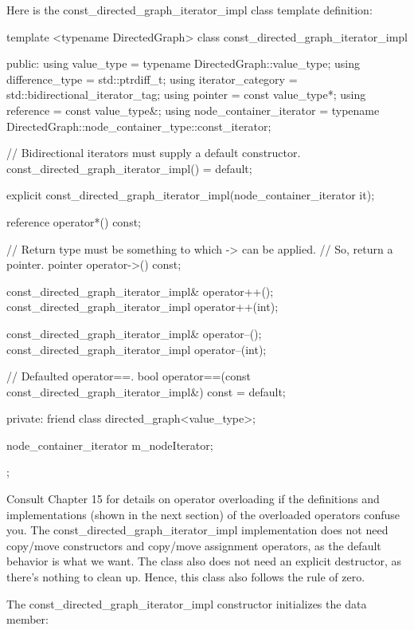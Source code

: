 Here is the const\_directed\_graph\_iterator\_impl class template definition:

\begin{cpp}
template <typename DirectedGraph>
class const_directed_graph_iterator_impl
{
    public:
        using value_type = typename DirectedGraph::value_type;
        using difference_type = std::ptrdiff_t;
        using iterator_category = std::bidirectional_iterator_tag;
        using pointer = const value_type*;
        using reference = const value_type&;
        using node_container_iterator =
            typename DirectedGraph::node_container_type::const_iterator;

        // Bidirectional iterators must supply a default constructor.
        const_directed_graph_iterator_impl() = default;

        explicit const_directed_graph_iterator_impl(node_container_iterator it);

        reference operator*() const;

        // Return type must be something to which -> can be applied.
        // So, return a pointer.
        pointer operator->() const;

        const_directed_graph_iterator_impl& operator++();
        const_directed_graph_iterator_impl operator++(int);

        const_directed_graph_iterator_impl& operator--();
        const_directed_graph_iterator_impl operator--(int);

        // Defaulted operator==.
        bool operator==(const const_directed_graph_iterator_impl&) const = default;

    private:
        friend class directed_graph<value_type>;

        node_container_iterator m_nodeIterator;
};
\end{cpp}

Consult Chapter 15 for details on operator overloading if the definitions and implementations (shown in the next section) of the overloaded operators confuse you. The const\_directed\_graph\_iterator\_impl implementation does not need copy/move constructors and copy/move assignment operators, as the default behavior is what we want. The class also does not need an explicit destructor, as there’s nothing to clean up. Hence, this class also follows the rule of zero.


The const\_directed\_graph\_iterator\_impl constructor initializes the data member:

